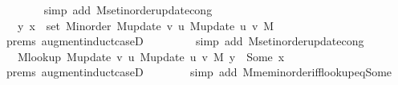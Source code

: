 \begin{isabellebody}
\ \ \ \ \ \ \isamarkupfalse%
\ {\isacharparenleft}{\kern0pt}simp\ add{\isacharcolon}{\kern0pt}\ M{\isachardot}{\kern0pt}set{\isacharunderscore}{\kern0pt}inorder{\isacharunderscore}{\kern0pt}update{\isacharunderscore}{\kern0pt}cong{\isacharparenright}{\kern0pt}\isanewline
\ \ \ \ \isamarkupfalse%
\ \isamarkupfalse%
\ {\isachardoublequoteopen}{\isachardot}{\kern0pt}{\isachardot}{\kern0pt}{\isachardot}{\kern0pt}\ {\isasymlongleftrightarrow}\ {\isacharparenleft}{\kern0pt}y{\isacharcomma}{\kern0pt}\ x{\isacharparenright}{\kern0pt}\ {\isasymin}\ set\ {\isacharparenleft}{\kern0pt}M{\isacharunderscore}{\kern0pt}inorder\ {\isacharparenleft}{\kern0pt}M{\isacharunderscore}{\kern0pt}update\ v\ u\ {\isacharparenleft}{\kern0pt}M{\isacharunderscore}{\kern0pt}update\ u\ v\ M{\isacharparenright}{\kern0pt}{\isacharparenright}{\kern0pt}{\isacharparenright}{\kern0pt}{\isachardoublequoteclose}\isanewline
\ \ \ \ \ \ \isamarkupfalse%
\ {\isachardoublequoteopen}{}{\isachardot}{\kern0pt}prems{\isachardoublequoteclose}\ augment{\isacharunderscore}{\kern0pt}induct{\isacharunderscore}{\kern0pt}case{\isacharunderscore}{\kern0pt}{}D{\isacharparenleft}{\kern0pt}{}{\isacharcomma}{\kern0pt}\ {}{\isacharparenright}{\kern0pt}\isanewline
\ \ \ \ \ \ \isamarkupfalse%
\ {\isacharparenleft}{\kern0pt}simp\ add{\isacharcolon}{\kern0pt}\ M{\isachardot}{\kern0pt}set{\isacharunderscore}{\kern0pt}inorder{\isacharunderscore}{\kern0pt}update{\isacharunderscore}{\kern0pt}cong{\isacharparenright}{\kern0pt}\isanewline
\ \ \ \ \isamarkupfalse%
\ \isamarkupfalse%
\ {\isachardoublequoteopen}{\isachardot}{\kern0pt}{\isachardot}{\kern0pt}{\isachardot}{\kern0pt}\ {\isasymlongleftrightarrow}\ M{\isacharunderscore}{\kern0pt}lookup\ {\isacharparenleft}{\kern0pt}M{\isacharunderscore}{\kern0pt}update\ v\ u\ {\isacharparenleft}{\kern0pt}M{\isacharunderscore}{\kern0pt}update\ u\ v\ M{\isacharparenright}{\kern0pt}{\isacharparenright}{\kern0pt}\ y\ {\isacharequal}{\kern0pt}\ Some\ x{\isachardoublequoteclose}\isanewline
\ \ \ \ \ \ \isamarkupfalse%
\ {\isachardoublequoteopen}{}{\isachardot}{\kern0pt}prems{\isachardoublequoteclose}\ augment{\isacharunderscore}{\kern0pt}induct{\isacharunderscore}{\kern0pt}case{\isacharunderscore}{\kern0pt}{}D{\isacharparenleft}{\kern0pt}{}{\isacharparenright}{\kern0pt}\isanewline
\ \ \ \ \ \ \isamarkupfalse%
\ {\isacharparenleft}{\kern0pt}simp\ add{\isacharcolon}{\kern0pt}\ M{\isachardot}{\kern0pt}mem{\isacharunderscore}{\kern0pt}inorder{\isacharunderscore}{\kern0pt}iff{\isacharunderscore}{\kern0pt}lookup{\isacharunderscore}{\kern0pt}eq{\isacharunderscore}{\kern0pt}Some{\isacharparenright}{\kern0pt}\isanewline

\end{isabellebody}
